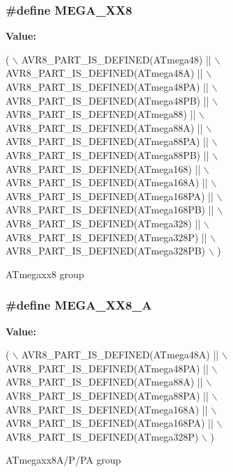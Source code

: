 \subsubsection[{M\+E\+G\+A\+\_\+\+X\+X8}]{\setlength{\rightskip}{0pt plus 5cm}\#define M\+E\+G\+A\+\_\+\+X\+X8}\label{group__mega__part__macros__group_ga47583caa82990781cd23a8495710ef31}
{\bfseries Value\+:}
\begin{DoxyCode}
( \(\backslash\)
        AVR8\_PART\_IS\_DEFINED(ATmega48)    || \(\backslash\)
        AVR8\_PART\_IS\_DEFINED(ATmega48A)   || \(\backslash\)
        AVR8\_PART\_IS\_DEFINED(ATmega48PA)  || \(\backslash\)
        AVR8\_PART\_IS\_DEFINED(ATmega48PB)  || \(\backslash\)
        AVR8\_PART\_IS\_DEFINED(ATmega88)    || \(\backslash\)
        AVR8\_PART\_IS\_DEFINED(ATmega88A)   || \(\backslash\)
        AVR8\_PART\_IS\_DEFINED(ATmega88PA)  || \(\backslash\)
        AVR8\_PART\_IS\_DEFINED(ATmega88PB)  || \(\backslash\)
        AVR8\_PART\_IS\_DEFINED(ATmega168)   || \(\backslash\)
        AVR8\_PART\_IS\_DEFINED(ATmega168A)  || \(\backslash\)
        AVR8\_PART\_IS\_DEFINED(ATmega168PA) || \(\backslash\)
        AVR8\_PART\_IS\_DEFINED(ATmega168PB) || \(\backslash\)
        AVR8\_PART\_IS\_DEFINED(ATmega328)   || \(\backslash\)
        AVR8\_PART\_IS\_DEFINED(ATmega328P)  || \(\backslash\)
        AVR8\_PART\_IS\_DEFINED(ATmega328PB) \(\backslash\)
        )
\end{DoxyCode}
A\+Tmegaxx8 group \hypertarget{group__mega__part__macros__group_gadb4a50447f658e564b640ca248e85b51}{}
\subsubsection[{M\+E\+G\+A\+\_\+\+X\+X8\+\_\+\+A}]{\setlength{\rightskip}{0pt plus 5cm}\#define M\+E\+G\+A\+\_\+\+X\+X8\+\_\+\+A}\label{group__mega__part__macros__group_gadb4a50447f658e564b640ca248e85b51}
{\bfseries Value\+:}
\begin{DoxyCode}
( \(\backslash\)
        AVR8\_PART\_IS\_DEFINED(ATmega48A)   || \(\backslash\)
        AVR8\_PART\_IS\_DEFINED(ATmega48PA)  || \(\backslash\)
        AVR8\_PART\_IS\_DEFINED(ATmega88A)   || \(\backslash\)
        AVR8\_PART\_IS\_DEFINED(ATmega88PA)  || \(\backslash\)
        AVR8\_PART\_IS\_DEFINED(ATmega168A)  || \(\backslash\)
        AVR8\_PART\_IS\_DEFINED(ATmega168PA) || \(\backslash\)
        AVR8\_PART\_IS\_DEFINED(ATmega328P) \(\backslash\)
        )
\end{DoxyCode}
A\+Tmegaxx8\+A/\+P/\+P\+A group \hypertarget{group__mega__part__macros__group_ga2b23bf35c1439ec05ddac769a8d8d1f8}{}
